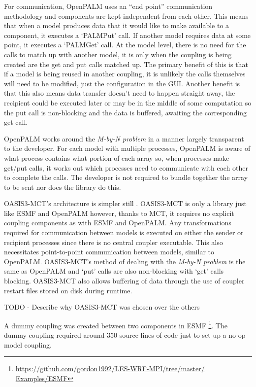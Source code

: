 \documentclass{acm_proc_article-sp}
\renewcommand{\_}{\underscore\hspace{0pt}}
\begin{document}
For communication, OpenPALM uses an ``end point'' communication methodology
\cite{CERFACS2007} and components are kept independent from each
other. This means that when a model produces data that it would like to make
available to a component, it executes a `PALM\_Put' call. If another model
requires data at some point, it executes a `PALM\_Get' call. At the model level,
there is no need for the calls to match up with another model, it is only when
the coupling is being created are the get and put calls matched up. The primary
benefit of this is that if a model is being reused in another coupling, it is
unlikely the calls themselves will need to be modified, just the configuration
in the GUI. Another benefit is that this also means data transfer doesn't need
to happen straight away, the recipient could be executed later or may be in the
middle of some computation so the put call is non-blocking and the data is
buffered, awaiting the corresponding get call.

OpenPALM works around the \textit{M-by-N problem} in a manner largely
transparent to the developer. For each model with multiple processes, OpenPALM
is aware of what process contains what portion of each array so, when processes
make get/put calls, it works out which processes need to communicate with each
other to complete the calls. The developer is not required to bundle together
the array to be sent nor does the library do this.

OASIS3-MCT's architecture is simpler still \cite{OASIS3-MCT2013}. OASIS3-MCT is
only a library just like ESMF and OpenPALM however, thanks to MCT, it requires
no explicit coupling components as with ESMF and OpenPALM. Any transformations
required for communication between models is executed on either the sender or
recipient processes since there is no central coupler executable. This also
necessitates point-to-point communication between models, similar to OpenPALM.
OASIS3-MCT's method of dealing with the \textit{M-by-N problem} is the same as
OpenPALM and `put' calls are also non-blocking with `get' calls blocking.
OASIS3-MCT also allows buffering of data through the use of coupler restart
files stored on disk during runtime.

TODO - Describe why OASIS3-MCT was chosen over the others


A dummy coupling was created between two components in ESMF
\footnote{\url{https://github.com/gordon1992/LES-WRF-MPI/tree/master/
Examples/ESMF}}.
The dummy coupling required around 350 source lines of code just to set up a
no-op model coupling.
\end{document}
